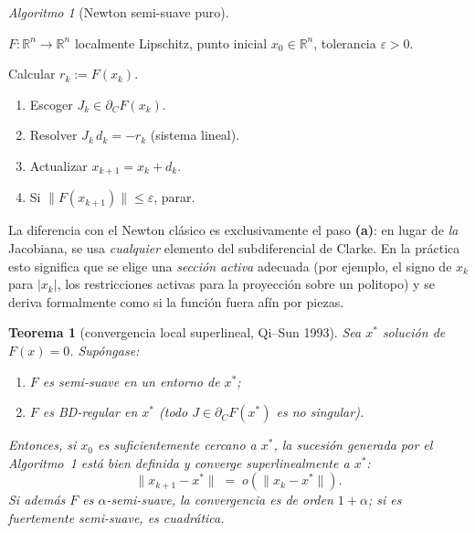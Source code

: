 \documentclass[12pt]{book}
\newcommand{\R}{\mathbb{R}}
\newcommand{\subdiff}{\partial}
\theoremstyle{definition}
\theoremstyle{plain}
\newtheorem{teorema}{Teorema}[section]
\theoremstyle{remark}
\newtheorem{algoritmo}{Algoritmo}[section]
\begin{document}
\begin{algoritmo}[Newton semi-suave puro]
  \hfill
  \begin{description}[leftmargin=1.2em,itemsep=2pt]
    \item[Entrada] $F:\R^n\to\R^n$ localmente Lipschitz, punto
      inicial $x_0\in\R^n$, tolerancia $\varepsilon>0$.
    \item[Paso $k\ge0$] Calcular $r_k:=F(x_k)$.
      \begin{enumerate}[leftmargin=1.4em,itemsep=1pt]
        \item Escoger $J_k\in\subdiff_C F(x_k)$.
        \item Resolver $J_k\,d_k=-r_k$ (sistema lineal).
        \item Actualizar $x_{k+1}=x_k+d_k$.
        \item Si $\|F(x_{k+1})\|\le\varepsilon$, parar.
      \end{enumerate}
  \end{description}
\end{algoritmo}

La diferencia con el Newton clásico es exclusivamente el paso
\textbf{(a)}: en lugar de \emph{la} Jacobiana, se usa
\emph{cualquier} elemento del subdiferencial de Clarke.  En la
práctica esto significa que se elige una \emph{sección activa}
adecuada (por ejemplo, el signo de $x_k$ para $|x_k|$, los
restricciones activas para la proyección sobre un politopo) y se
deriva formalmente como si la función fuera afín por piezas.

\begin{teorema}[convergencia local superlineal, Qi--Sun 1993]
  Sea $x^*$ solución de $F(x)=0$.  Supóngase:
  \begin{enumerate}[label=\textup{(\roman*)},leftmargin=1.6em,itemsep=1pt]
    \item $F$ es semi-suave en un entorno de $x^*$;
    \item $F$ es BD-regular en $x^*$ (todo $J\in\subdiff_C F(x^*)$ es
          no singular).
  \end{enumerate}
  Entonces, si $x_0$ es suficientemente cercano a $x^*$, la
  sucesión generada por el Algoritmo~1 está bien definida y
  converge superlinealmente a $x^*$:
  \[
    \boxed{\;
    \|x_{k+1}-x^*\| \;=\; o(\|x_k-x^*\|).
    \;}
  \]
  Si además $F$ es $\alpha$-semi-suave, la convergencia es de orden
  $1+\alpha$; si es fuertemente semi-suave, es \emph{cuadrática}.
\end{teorema}
\end{document}
